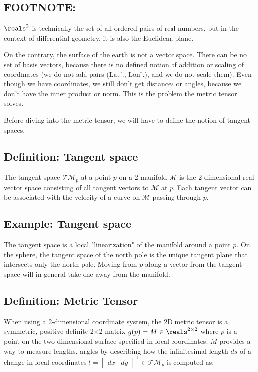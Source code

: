 \subsection{FOOTNOTE:}
$\reals^2$ is technically the set of all ordered pairs of real numbers, but in the context of differential geometry, it is also the Euclidean plane.



On the contrary, the surface of the earth is not a vector space. There can be no set of basis vectors, because there is no defined notion of addition or scaling of coordinates (we do not add pairs ($\text{Lat}^\circ$., $\text{Lon}^\circ$.), and we do not scale them). Even though we have coordinates, we still don't get distances or angles, because we don't have the inner product or norm. This is the problem the metric tensor solves. 

Before diving into the metric tensor, we will have to define the notion of tangent spaces.



\subsection{ Definition: Tangent space}
The tangent space $\mathcal{TM}_p$ at a point $p$ on a 2-manifold $\mathcal{M}$ is the 2-dimensional real vector space consisting of all tangent vectors to $\mathcal{M}$ at $p$. Each tangent vector can be associated with the velocity of a curve on $\mathcal{M}$ passing through $p$. 

\subsection{ Example: Tangent space}
The tangent space is a local "linearization" of the manifold around a point $p$. On the sphere, the tangent space of the north pole is the unique tangent plane that intersects only the north pole. Moving from $p$ along a vector from the tangent space will in general take one away from the manifold.

\subsection{ Definition: Metric Tensor}

When using a 2-dimensional coordinate system, the 2D metric tensor is a symmetric, positive-definite 2×2 matrix $g(p) = M \in \reals^{2\times 2}$  where $p$ is a point on the two-dimensional surface specified in local coordinates. $M$ provides a way to measure lengths, angles by describing how the infinitesimal length $ds$ of a change in local coordinates $t=\begin{bmatrix} dx & dy\end{bmatrix}^\top \in \mathcal{TM}_p$ is computed as:

